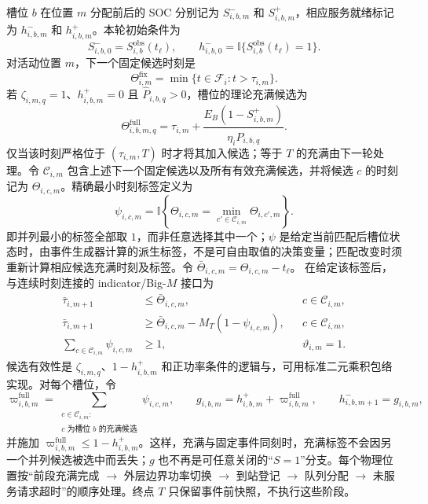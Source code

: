 \documentclass[12pt,a4paper,UTF8]{ctexart}
\begin{document}
槽位 $b$ 在位置 $m$ 分配前后的 SOC 分别记为
$S_{i,b,m}^{-}$ 和 $S_{i,b,m}^{+}$，相应服务就绪标记为
$h_{i,b,m}^{-}$ 和 $h_{i,b,m}^{+}$。本轮初始条件为
\begin{equation}
S_{i,b,0}^{-}=S_{i,b}^{\mathrm{obs}}(t_\ell),
\qquad
h_{i,b,0}^{-}=\mathbb I\{S_{i,b}^{\mathrm{obs}}(t_\ell)=1\}.
\label{eq:initial_battery_soc}
\end{equation}
对活动位置 $m$，下一个固定候选时刻是
\[
\Theta_{i,m}^{\mathrm{fix}}
=\min\{t\in\mathcal F_i:t>\tau_{i,m}\}.
\]
若 $\zeta_{i,m,q}=1$、$h_{i,b,m}^{+}=0$ 且
$\widehat P_{i,b,q}>0$，槽位的理论充满候选为
\begin{equation}
\Theta_{i,b,m,q}^{\mathrm{full}}
=\tau_{i,m}
+\frac{E_B(1-S_{i,b,m}^{+})}
{\eta_i\widehat P_{i,b,q}}.
\label{eq:full_time_candidate}
\end{equation}
仅当该时刻严格位于 $(\tau_{i,m},T)$ 时才将其加入候选；等于 $T$ 的充满由下一轮处理。令 $\mathcal C_{i,m}$ 包含上述下一个固定候选以及所有有效充满候选，并将候选 $c$ 的时刻记为 $\Theta_{i,c,m}$。精确最小时刻标签定义为
\[
\psi_{i,c,m}
=\mathbb I\!\left\{
\Theta_{i,c,m}=\min_{c'\in\mathcal C_{i,m}}
\Theta_{i,c',m}\right\}.
\]
即并列最小的标签全部取 $1$，而非任意选择其中一个；$\psi$ 是给定当前匹配后槽位状态时，由事件生成器计算的派生标签，不是可自由取值的决策变量；匹配改变时须重新计算相应候选充满时刻及标签。令
$\bar\Theta_{i,c,m}=\Theta_{i,c,m}-t_\ell$。
在给定该标签后，与连续时刻连接的 indicator/Big-$M$ 接口为
\begin{subequations}
\label{eq:next_physical_event}
\begin{align}
\bar\tau_{i,m+1}&\le\bar\Theta_{i,c,m},
&&c\in\mathcal C_{i,m},\\
\bar\tau_{i,m+1}&\ge
\bar\Theta_{i,c,m}-M_T(1-\psi_{i,c,m}),
&&c\in\mathcal C_{i,m},\\
\sum_{c\in\mathcal C_{i,m}}\psi_{i,c,m}&\ge1,
&&\vartheta_{i,m}=1.
\end{align}
\end{subequations}
候选有效性是 $\zeta_{i,m,q}$、$1-h_{i,b,m}^{+}$ 和正功率条件的逻辑与，可用标准二元乘积包络实现。对每个槽位，令
\[
\varpi_{i,b,m}^{\mathrm{full}}
=\sum_{\substack{c\in\mathcal C_{i,m}:\\
c\text{ 为槽位 }b\text{ 的充满候选}}}
\psi_{i,c,m},
\qquad
g_{i,b,m}=h_{i,b,m}^{+}+\varpi_{i,b,m}^{\mathrm{full}},
\qquad
h_{i,b,m+1}^{-}=g_{i,b,m},
\]
并施加 $\varpi_{i,b,m}^{\mathrm{full}}\le1-h_{i,b,m}^{+}$。这样，充满与固定事件同刻时，充满标签不会因另一个并列候选被选中而丢失；$g$ 也不再是可任意关闭的“$S=1$”分支。每个物理位置按“前段充满完成 $\rightarrow$ 外层边界功率切换 $\rightarrow$ 到站登记 $\rightarrow$ 队列分配 $\rightarrow$ 未服务请求超时”的顺序处理。终点 $T$ 只保留事件前快照，不执行这些阶段。
\end{document}
